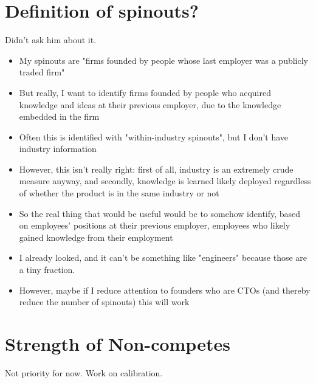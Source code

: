 \documentclass[12pt,english]{article}
\theoremstyle{remark}
\begin{document}
\section{Definition of spinouts?}

Didn't ask him about it.

\begin{itemize}
	\item My spinouts are "firms founded by people whose last employer was a publicly traded firm"
	\item But really, I want to identify firms founded by people who acquired knowledge and ideas at their previous employer, due to the knowledge embedded in the firm
	\item Often this is identified with "within-industry spinouts", but I don't have industry information
	\item However, this isn't really right: first of all, industry is an extremely crude measure anyway, and secondly, knowledge is learned likely deployed regardless of whether the product is in the same industry or not
	\item So the real thing that would be useful would be to somehow identify, based on employees' positions at their previous employer, employees who likely gained knowledge from their employment
	\item I already looked, and it can't be something like "engineers" because those are a tiny fraction. 
	\item However, maybe if I reduce attention to founders who are CTOs (and thereby reduce the number of spinouts) this will work
\end{itemize}

\section{Strength of Non-competes}

Not priority for now. Work on calibration.
\end{document}
